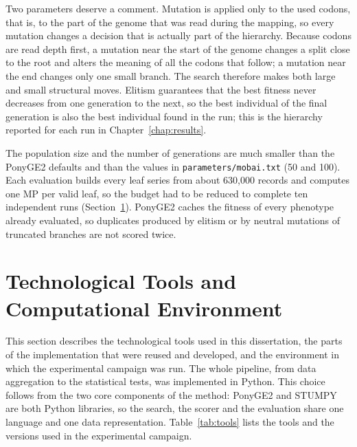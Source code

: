 Two parameters deserve a comment.
Mutation is applied only to the used codons, that is, to the part of the genome that was read during the mapping, so every mutation changes a decision that is actually part of the hierarchy.
Because codons are read depth first, a mutation near the start of the genome changes a split close to the root and alters the meaning of all the codons that follow; a mutation near the end changes only one small branch.
The search therefore makes both large and small structural moves.
Elitism guarantees that the best fitness never decreases from one generation to the next, so the best individual of the final generation is also the best individual found in the run; this is the hierarchy reported for each run in Chapter~\ref{chap:results}.

The population size and the number of generations are much smaller than the PonyGE2 defaults and than the values in \texttt{parameters/mobai.txt} (50 and 100).
Each evaluation builds every leaf series from about 630{,}000 records and computes one \ac{MP} per valid leaf, so the budget had to be reduced to complete ten independent runs (Section~\ref{sec:tools}).
PonyGE2 caches the fitness of every phenotype already evaluated, so duplicates produced by elitism or by neutral mutations of truncated branches are not scored twice.

\section{Technological Tools and Computational Environment}
\label{sec:tools}

This section describes the technological tools used in this dissertation, the parts of the implementation that were reused and developed, and the environment in which the experimental campaign was run.
The whole pipeline, from data aggregation to the statistical tests, was implemented in Python.
This choice follows from the two core components of the method: PonyGE2 \parencite{fenton2017} and STUMPY \parencite{law2019stumpy} are both Python libraries, so the search, the scorer and the evaluation share one language and one data representation.
Table~\ref{tab:tools} lists the tools and the versions used in the experimental campaign.

